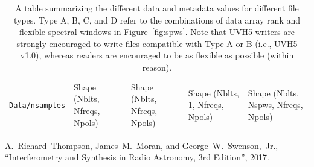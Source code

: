 \documentclass[11pt, oneside]{article}
\begin{document}
\begin{table}[t]
\begin{center}
\begin{tabular}{ m{8em} | m{10em} | m{10em} | m{10em} | m{10em}}
      \texttt{Data/nsamples} & Shape (Nblts, Nfreqs, Npols) & Shape (Nblts, Nfreqs, Npols) & Shape (Nblts, 1, Nfreqs, Npols) & Shape (Nblts, Nspws, Nfreqs, Npols) \\
    \end{tabular}
  \end{center}
  \caption{A table summarizing the different data and metadata values for
    different file types. Type A, B, C, and D refer to the combinations of data
    array rank and flexible spectral windows in Figure~\ref{fig:spws}. Note that
    UVH5 writers are strongly encouraged to write files compatible with Type A
    or B (i.e., UVH5 v1.0), whereas readers are encouraged to be as flexible as
    possible (within reason).}
  \label{table:spw}
\end{table}

\begin{thebibliography}{9}

 A.~Richard~Thompson, James~M.~Moran, and George~W.~Swenson,~Jr.,
  ``Interferometry and Synthesis in Radio Astronomy, 3rd Edition'', 2017.

\end{thebibliography}

\newpage
\end{document}
